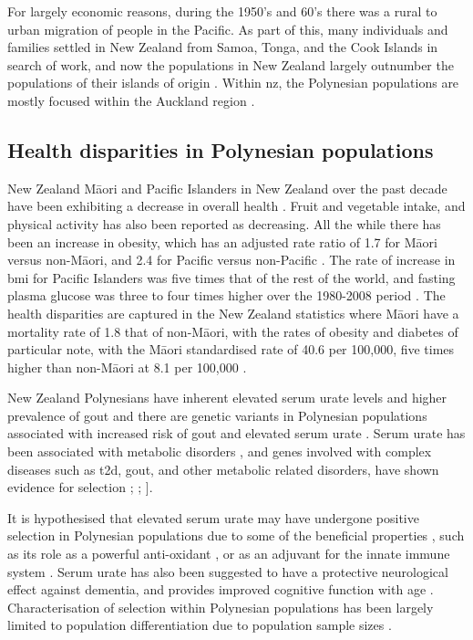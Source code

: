 \documentclass[twoside,openright]{report}
\newcommand{\tex}[1]{#1}
\begin{document}
For largely economic reasons, during the 1950's and 60's there was a
rural to urban migration of people in the Pacific. As part of this, many
individuals and families settled in New Zealand from Samoa, Tonga, and
the Cook Islands in search of work, and now the populations in New
Zealand largely outnumber the populations of their islands of origin
\citep{MatisooSmith2012highway}. Within \gls{nz}, the Polynesian
populations are mostly focused within the Auckland region
\citep{Barcham2009}.

\subsection{Health disparities in Polynesian
populations}\label{health-disparities-in-polynesian-populations}

New Zealand M\tex{\={a}}ori and Pacific Islanders in New Zealand over
the past decade have been exhibiting a decrease in overall health
\citep{MinistryofHealth2016}. Fruit and vegetable intake, and physical
activity has also been reported as decreasing. All the while there has
been an increase in obesity, which has an adjusted rate ratio of 1.7 for
M\tex{\={a}}ori versus non-M\tex{\={a}}ori, and 2.4 for Pacific versus
non-Pacific \citep{MinistryofHealth2016}. The rate of increase in
\gls{bmi} for Pacific Islanders was five times that of the rest of the
world, and fasting plasma glucose was three to four times higher over
the 1980-2008 period \citep{Hawley2015}. The health disparities are
captured in the New Zealand statistics where M\tex{\={a}}ori have a
mortality rate of 1.8 that of non-M\tex{\={a}}ori, with the rates of
obesity and diabetes of particular note, with the M\tex{\={a}}ori
standardised rate of 40.6 per 100,000, five times higher than
non-M\tex{\={a}}ori at 8.1 per 100,000 \citep{MinistryofHealth2012}.

New Zealand Polynesians have inherent elevated serum urate levels and
higher prevalence of gout \citep{Winnard2012, Winnard2013} and there are
genetic variants in Polynesian populations associated with increased
risk of gout and elevated serum urate
\citep{Phipps-Green2010, Phipps-Green2016}. Serum urate has been
associated with metabolic disorders \citep{Choi2007, Choi2007b}, and
genes involved with complex diseases such as \gls{t2d}, gout, and other
metabolic related disorders, have shown evidence for selection
\citet{Hancock2008}; \citet{pickrell2009signals}; \citet{Zhang2013a}{]}.

It is hypothesised that elevated serum urate may have undergone positive
selection in Polynesian populations due to some of the beneficial
properties \citep{Gosling2014}, such as its role as a powerful
anti-oxidant \citep{Ames1981}, or as an adjuvant for the innate immune
system \citep{Opitz2009}. Serum urate has also been suggested to have a
protective neurological effect against dementia, and provides improved
cognitive function with age \citep{Euser2009}. Characterisation of
selection within Polynesian populations has been largely limited to
population differentiation due to population sample sizes
\citep{Kimura2008, Mallick2016}.
\end{document}
